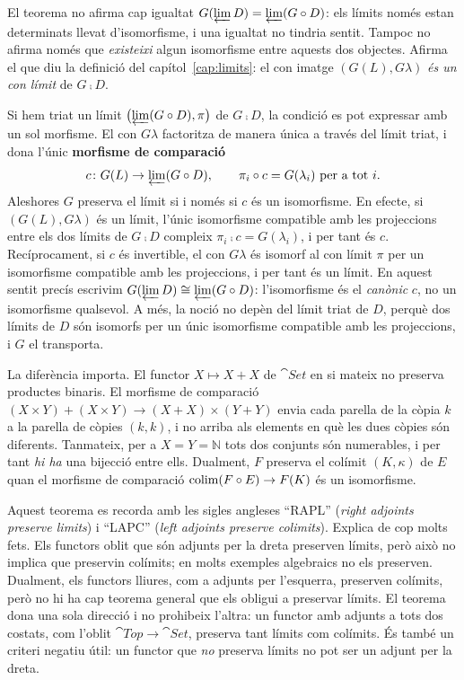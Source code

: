 \begin{observacio}\label{obs:preservar-canonic}
El teorema no afirma cap igualtat $G(\varprojlim D)=\varprojlim(G\circ D)$: els límits només estan determinats llevat d'isomorfisme, i una igualtat no tindria sentit. Tampoc no afirma només que \emph{existeixi} algun isomorfisme entre aquests dos objectes. Afirma el que diu la definició del capítol~\ref{cap:limits}: el con imatge $(G(L),G\lambda)$ \emph{és un con límit} de $G\comp D$.

Si hem triat un límit $\bigl(\varprojlim(G\circ D),\pi\bigr)$ de $G\comp D$, la condició es pot expressar amb un sol morfisme. El con $G\lambda$ factoritza de manera única a través del límit triat, i dona l'únic \textbf{morfisme de comparació}
\[
c\colon G(L)\to\varprojlim(G\circ D),\qquad \pi_i\circ c=G(\lambda_i)\ \text{per a tot } i.
\]
Aleshores $G$ preserva el límit si i només si $c$ és un isomorfisme. En efecte, si $(G(L),G\lambda)$ és un límit, l'únic isomorfisme compatible amb les projeccions entre els dos límits de $G\comp D$ compleix $\pi_i\comp c=G(\lambda_i)$, i per tant és $c$. Recíprocament, si $c$ és invertible, el con $G\lambda$ és isomorf al con límit $\pi$ per un isomorfisme compatible amb les projeccions, i per tant és un límit. En aquest sentit precís escrivim $G(\varprojlim D)\cong\varprojlim(G\circ D)$: l'isomorfisme és el \emph{canònic} $c$, no un isomorfisme qualsevol. A més, la noció no depèn del límit triat de $D$, perquè dos límits de $D$ són isomorfs per un únic isomorfisme compatible amb les projeccions, i $G$ el transporta.

La diferència importa. El functor $X\mapsto X+X$ de $\cat{Set}$ en si mateix no preserva productes binaris. El morfisme de comparació $(X\times Y)+(X\times Y)\to(X+X)\times(Y+Y)$ envia cada parella de la còpia $k$ a la parella de còpies $(k,k)$, i no arriba als elements en què les dues còpies són diferents. Tanmateix, per a $X=Y=\mathbb N$ tots dos conjunts són numerables, i per tant \emph{hi ha} una bijecció entre ells. Dualment, $F$ preserva el colímit $(K,\kappa)$ de $E$ quan el morfisme de comparació $\operatorname*{colim}(F\circ E)\to F(K)$ és un isomorfisme.
\end{observacio}

\begin{observacio}
Aquest teorema es recorda amb les sigles angleses \enquote{RAPL} (\emph{right adjoints preserve limits}) i \enquote{LAPC} (\emph{left adjoints preserve colimits}). Explica de cop molts fets. Els functors oblit que són adjunts per la dreta preserven límits, però això no implica que preservin colímits; en molts exemples algebraics no els preserven. Dualment, els functors lliures, com a adjunts per l'esquerra, preserven colímits, però no hi ha cap teorema general que els obligui a preservar límits. El teorema dona una sola direcció i no prohibeix l'altra: un functor amb adjunts a tots dos costats, com l'oblit $\cat{Top}\to\cat{Set}$, preserva tant límits com colímits. És també un criteri negatiu útil: un functor que \emph{no} preserva límits no pot ser un adjunt per la dreta.
\end{observacio}

